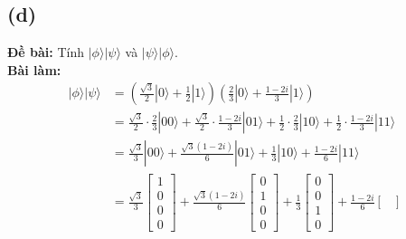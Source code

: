 \subsection{(d)}
\textbf{Đề bài:} Tính $|\phi\rangle|\psi\rangle$ và $|\psi\rangle|\phi\rangle$.\\
\textbf{Bài làm:}
\begin{align*}
    |\phi\rangle|\psi\rangle & = \left(\frac{\sqrt{3}}{2}|0\rangle+\frac{1}{2}|1\rangle\right)\left(\frac{2}{3}|0\rangle+\frac{1-2i}{3}|1\rangle\right)                                                            \\
                             & = \frac{\sqrt{3}}{2}\cdot\frac{2}{3}|00\rangle + \frac{\sqrt{3}}{2}\cdot\frac{1-2i}{3}|01\rangle + \frac{1}{2}\cdot\frac{2}{3}|10\rangle + \frac{1}{2}\cdot\frac{1-2i}{3}|11\rangle \\
                             & = \frac{\sqrt{3}}{3}|00\rangle + \frac{\sqrt{3}(1-2i)}{6}|01\rangle + \frac{1}{3}|10\rangle + \frac{1-2i}{6}|11\rangle                                                              \\
                             & = \frac{\sqrt{3}}{3} \begin{bmatrix}
                                                        1 \\
                                                        0 \\
                                                        0 \\
                                                        0
                                                    \end{bmatrix}
    + \frac{\sqrt{3}(1-2i)}{6} \begin{bmatrix}
                                   0 \\
                                   1 \\
                                   0 \\
                                   0
                               \end{bmatrix}
    + \frac{1}{3} \begin{bmatrix}
                      0 \\
                      0 \\
                      1 \\
                      0
                  \end{bmatrix}
    + \frac{1-2i}{6} \begin{bmatrix}

\end{bmatrix}
\end{align*}
